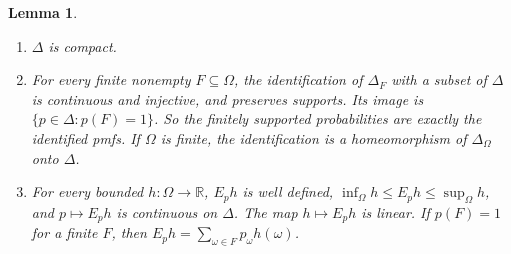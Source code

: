 \documentclass[11pt]{article}
\newtheorem{lemma}[theorem]{Lemma}
\theoremstyle{definition}
\theoremstyle{remark}
\begin{document}
\begin{lemma}\label{lem:probabilities}
\leavevmode
\begin{enumerate}[label=(\alph*)]
\item $\Delta$ is compact.
\item For every finite nonempty $F\subseteq\Omega$, the identification of $\Delta_F$ with a subset of $\Delta$ is continuous and injective, and preserves supports. Its image is $\{p\in\Delta:p(F)=1\}$. So the finitely supported probabilities are exactly the identified pmfs. If $\Omega$ is finite, the identification is a homeomorphism of $\Delta_\Omega$ onto $\Delta$.
\item For every bounded $h:\Omega\to\mathbb R$, $E_ph$ is well defined, $\inf_\Omega h\le E_ph\le\sup_\Omega h$, and $p\mapsto E_ph$ is continuous on $\Delta$. The map $h\mapsto E_ph$ is linear. If $p(F)=1$ for a finite $F$, then $E_ph=\sum_{\omega\in F}p_\omega h(\omega)$.
\end{enumerate}
\end{lemma}
\end{document}
